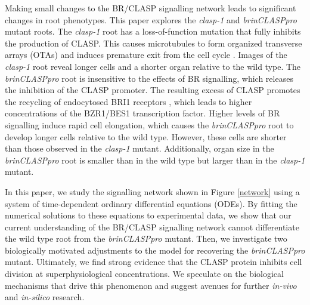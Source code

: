 \documentclass[referee,pdflatex,sn-mathphys-num]{sn-jnl}
\begin{document}
Making small changes to the BR/CLASP signalling network leads to significant changes in root phenotypes. This paper explores the \emph{clasp-1} \cite{ambrose2007} and \emph{brinCLASPpro} \cite{ruan2018} mutant roots. The \emph{clasp-1} root has a loss-of-function mutation that fully inhibits the production of CLASP. This causes microtubules to form organized transverse arrays (OTAs) and induces premature exit from the cell cycle \cite{halat2022}. Images of the \emph{clasp-1} root reveal longer cells and a shorter organ relative to the wild type. The \emph{brinCLASPpro} root is insensitive to the effects of BR signalling, which releases the inhibition of the CLASP promoter. The resulting excess of CLASP promotes the recycling of endocytosed BRI1 receptors \cite{ruan2018}, which leads to higher concentrations of the BZR1/BES1 transcription factor. Higher levels of BR signalling induce rapid cell elongation, which causes the \emph{brinCLASPpro} root to develop longer cells relative to the wild type. However, these cells are shorter than those observed in the \emph{clasp-1} mutant. Additionally, organ size in the \emph{brinCLASPpro} root is smaller than in the wild type but larger than in the \emph{clasp-1} mutant.

In this paper, we study the signalling network shown in Figure \ref{network} using a system of time-dependent ordinary differential equations (ODEs). By fitting the numerical solutions to these equations to experimental data, we show that our current understanding of the BR/CLASP signalling network cannot differentiate the wild type root from the \emph{brinCLASPpro} mutant. Then, we investigate two biologically motivated adjustments to the model for recovering the \emph{brinCLASPpro} mutant. Ultimately, we find strong evidence that the CLASP protein inhibits cell division at superphysiological concentrations. We speculate on the biological mechanisms that drive this phenomenon and suggest avenues for further \emph{in-vivo} and \emph{in-silico} research.
\end{document}
